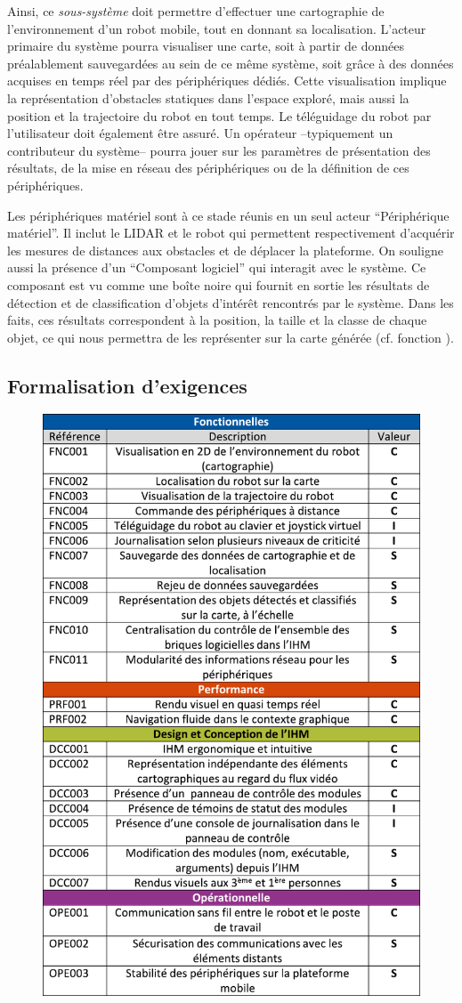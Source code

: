 Ainsi, ce \emph{sous-système} doit permettre d'effectuer une cartographie de l'environnement d'un robot mobile, tout en donnant sa localisation. 
L'acteur primaire du système pourra visualiser une carte, soit à partir de données préalablement sauvegardées au sein de ce même système, soit grâce à des données acquises en temps réel par des périphériques dédiés. 
Cette visualisation implique la représentation d'obstacles statiques dans l'espace exploré, mais aussi la position et la trajectoire du robot en tout temps.
Le téléguidage du robot par l'utilisateur doit également être assuré. 
Un opérateur --typiquement un contributeur du système-- pourra jouer sur les paramètres de présentation des résultats, de la mise en réseau des périphériques ou de la définition de ces périphériques. 

Les périphériques matériel sont à ce stade réunis en un seul acteur ``Périphérique matériel''.
Il inclut le LIDAR et le robot qui permettent respectivement d'acquérir les mesures de distances aux obstacles et de déplacer la plateforme.
On souligne aussi la présence d'un ``Composant logiciel'' qui interagit avec le système.
Ce composant est vu comme une boîte noire qui fournit en sortie les résultats de détection et de classification d'objets d'intérêt rencontrés par le système.
Dans les faits, ces résultats correspondent à la position, la taille et la \gls{classe} de chaque objet, ce qui nous permettra de les représenter sur la carte générée (cf. fonction ).

\subsection{Formalisation d'exigences}

\begin{figure}[h]
  \centering
    \includegraphics[width=.65\linewidth]{figures/exigences}  
  \label{fig:exigences}
\end{figure}

